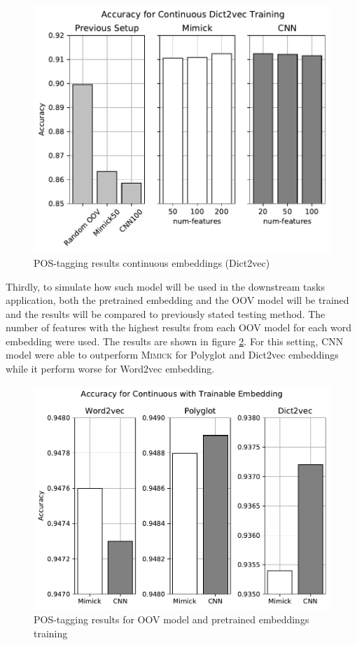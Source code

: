       \begin{figure}[H]
        \centering
        \includegraphics[width=0.8\linewidth]{images/continuous_dict2vec.pdf}
        \caption{POS-tagging results continuous embeddings (Dict2vec)}
        \label{fig:postag_dict2vec_continuous_results}
      \end{figure}

      Thirdly, to simulate how such model will be used in the
      downstream tasks application, both the pretrained embedding and
      the OOV model will be trained and the results will be compared
      to previously stated testing method. The number of features with
      the highest results from each OOV model for each word embedding
      were used. The results are shown in figure
      \ref{fig:postag_train_embed_results}. For this setting, CNN
      model were able to outperform \textsc{Mimick} for Polyglot and
      Dict2vec embeddings while it perform worse for Word2vec embedding.
      \begin{figure}[H]
        \centering
        \includegraphics[width=0.8\linewidth]{images/train_embed.pdf}
        \caption{POS-tagging results for OOV model and pretrained embeddings training}
        \label{fig:postag_train_embed_results}
      \end{figure}
      
